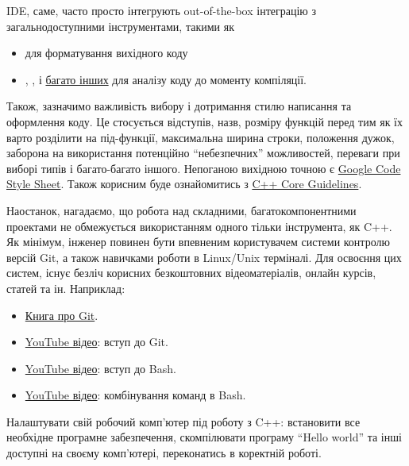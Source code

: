 \documentclass[12pt]{article}
\begin{document}
	IDE, саме, часто просто інтегрують out-of-the-box інтеграцію з загальнодоступними інструментами, такими як
	\begin{itemize}
		\item {} для форматування вихідного коду
		\item {}, ,  і \href{https://en.wikipedia.org/wiki/List_of_tools_for_static_code_analysis#C,_C++}{багато інших} для аналізу коду до моменту компіляції.
	\end{itemize}

	Також, зазначимо важливість вибору і дотримання стилю написання та оформлення коду. Це стосується відступів, назв, розміру функцій перед тим як їх варто розділити на під-функції, максимальна ширина строки, положення дужок, заборона на використання потенційно ``небезпечних'' можливостей, переваги при виборі типів і багато-багато іншого. Непоганою вихідною точною є \href{https://google.github.io/styleguide/cppguide.html}{Google Code Style Sheet}. Також корисним буде ознайомитись з \href{https://github.com/isocpp/CppCoreGuidelines}{C++ Core Guidelines}.

	Наостанок, нагадаємо, що робота над складними, багатокомпонентними проектами не обмежується використанням одного тільки інструмента, як C++. Як мінімум, інженер повинен бути впевненим користувачем системи контролю версій Git, а також навичками роботи в Linux/Unix терміналі. Для освоєння цих систем, існує безліч корисних безкоштовних відеоматеріалів, онлайн курсів, статей та ін. Наприклад:
	\begin{itemize}
		\item \href{https://git-scm.com/book/en/v2}{Книга про Git}.
		\item \href{https://www.youtube.com/watch?v=hwP7WQkmECE}{YouTube відео}: вступ до Git.
		\item \href{https://www.youtube.com/watch?v=oxuRxtrO2Ag}{YouTube відео}: вступ до Bash.
		\item \href{https://www.youtube.com/watch?v=mV_8GbzwZMM}{YouTube відео}: комбінування команд в Bash.
	\end{itemize}

	Налаштувати свій робочий комп'ютер під роботу з C++: встановити все необхідне програмне забезпечення, скомпілювати програму ``Hello world'' та інші доступні на своєму комп'ютері, переконатись в коректній роботі.
\end{document}
